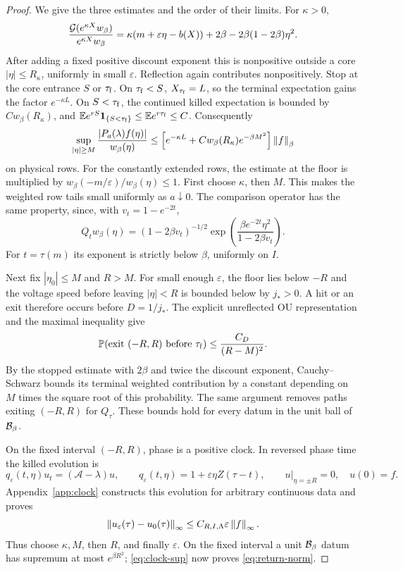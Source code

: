 \begin{proof}
We give the three estimates and the order of their limits.
For $\kappa>0$,
\[
 \frac{\mathcal G(e^{\kappa X}w_\beta)}{e^{\kappa X}w_\beta}
 =\kappa(m+\varepsilon\eta-b(X))
                     +2\beta-2\beta(1-2\beta)\eta^2.
\]
After adding a fixed positive discount exponent this is nonpositive
outside a core $|\eta|\le R_\kappa$, uniformly in small $\varepsilon$.
Reflection again contributes nonpositively. Stop at the core entrance
$S$ or ${\tau_{\mathrm f}}$. On ${\tau_{\mathrm f}}<S$, $X_{\tau_{\mathrm f}}=L$, so the terminal expectation gains
the factor $e^{-\kappa L}$. On $S<{\tau_{\mathrm f}}$, the continued killed expectation
is bounded by $Cw_\beta(R_\kappa)$, and
$\mathbb E e^{rS}\mathbf 1_{\{S<{\tau_{\mathrm f}}\}}\le\mathbb E e^{r{\tau_{\mathrm f}}}\le C$. Consequently
\begin{equation}\label{eq:return-rows}
 \sup_{|\eta|\ge M}
 \frac{|P_a(\lambda)f(\eta)|}{w_\beta(\eta)}
 \le\left[e^{-\kappa L}+Cw_\beta(R_\kappa)e^{-\beta M^2}\right]\left\|f\right\|_\beta
\end{equation}
on physical rows. For the constantly extended rows, the estimate at the floor is
multiplied by $w_\beta(-m/\varepsilon)/w_\beta(\eta)\le1$.
First choose $\kappa$, then $M$. This makes the weighted row tails
small uniformly as $a\downarrow0$. The comparison operator has the same
property, since, with $v_t=1-e^{-2t}$,
\[
 Q_tw_\beta(\eta)=(1-2\beta v_t)^{-1/2}
     \exp\!\left(\frac{\beta e^{-2t}\eta^2}{1-2\beta v_t}\right).
\]
For $t=\tau(m)$ its exponent is strictly below $\beta$, uniformly on $I$.

Next fix $|\eta_0|\le M$ and $R>M$. For small enough $\varepsilon$,
the floor lies below $-R$ and the voltage speed before leaving
$|\eta|<R$ is bounded below by $j_*>0$. A hit or an exit therefore
occurs before $D=1/j_*$. The explicit unreflected OU representation
and the maximal inequality give
\[
 \mathbb P(\text{exit }(-R,R)\text{ before }{\tau_{\mathrm f}})\le \frac{C_D}{(R-M)^2}.
\]
By the stopped estimate with $2\beta$ and twice the discount exponent,
Cauchy--Schwarz bounds its terminal weighted contribution by a constant
depending on $M$ times the square root of this probability. The same
argument removes paths exiting $(-R,R)$ for $Q_\tau$. These bounds
hold for every datum in the unit ball of $\mathcal B_\beta$.

On the fixed interval $(-R,R)$, phase is a positive clock. In reversed
phase time the killed evolution is
\begin{equation}\label{eq:clock-equation}
 q_\varepsilon(t,\eta)u_t=(\mathcal A-\lambda)u,\qquad
 q_\varepsilon(t,\eta)=1+\varepsilon\eta Z(\tau-t),\qquad
 u|_{\eta=\pm R}=0,\quad u(0)=f.
\end{equation}
Appendix~\ref{app:clock} constructs this evolution for arbitrary
continuous data and proves
\begin{equation}\label{eq:clock-sup}
 \left\|u_\varepsilon(\tau)-u_0(\tau)\right\|_\infty
       \le C_{R,I,\Lambda}\varepsilon\left\|f\right\|_\infty.
\end{equation}
Thus choose $\kappa,M$, then $R$, and finally $\varepsilon$. On the
fixed interval a unit $\mathcal B_\beta$ datum has supremum at most
$e^{\beta R^2}$; \eqref{eq:clock-sup} now proves
\eqref{eq:return-norm}.


\end{proof}
